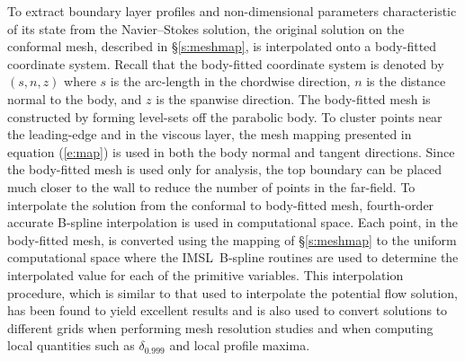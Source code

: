 To extract boundary layer profiles and non-dimensional parameters
characteristic of its state from the Navier--Stokes solution, the original
solution on the conformal mesh, described in \S\ref{s:meshmap}, is
interpolated onto a body-fitted coordinate system.  Recall that the
body-fitted coordinate system is denoted by $(s,n,z)$ where $s$ is the
arc-length in the chordwise direction, $n$ is the distance normal to the body,
and $z$ is the spanwise direction.  The body-fitted mesh is constructed by
forming level-sets off the parabolic body.  To cluster points near the
leading-edge and in the viscous layer, the mesh mapping presented in equation
(\ref{e:map}) is used in both the body normal and tangent directions.  Since
the body-fitted mesh is used only for analysis, the top boundary can be placed
much closer to the wall to reduce the number of points in the far-field.  To
interpolate the solution from the conformal to body-fitted mesh, fourth-order
accurate B-spline interpolation is used in computational space.  Each point,
in the body-fitted mesh, is converted using the mapping of \S\ref{s:meshmap}
to the uniform computational space where the IMSL\ B-spline routines
\cite{IMSL:91} are used to determine the interpolated value for each of the
primitive variables.  This interpolation procedure, which is similar to that
used to interpolate the potential flow solution, has been found to yield
excellent results and is also used to convert solutions to different grids
when performing mesh resolution studies and when computing local quantities
such as $\delta_{0.999}$ and local profile maxima.

